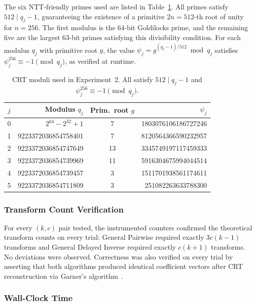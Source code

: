 \documentclass[runningheads]{llncs}
\begin{document}
The six NTT-friendly primes used are listed in Table~\ref{tab:exp2_moduli}. All primes satisfy $512 \mid q_j - 1$, guaranteeing the existence of a primitive $2n = 512$-th root of unity for $n = 256$. The first modulus is the 64-bit Goldilocks prime, and the remaining five are the largest 63-bit primes satisfying this divisibility condition. For each modulus $q_j$ with primitive root $g$, the value $\psi_j = g^{(q_j - 1)/512} \bmod q_j$ satisfies $\psi_j^{256} \equiv -1 \pmod{q_j}$, as verified at runtime.

\begin{table}[H]
\centering
\small
\begin{tabular}{c r c r}
\hline
$j$ & Modulus $q_j$ & Prim.\ root $g$ & $\psi_j$ \\
\hline
0 & $2^{64} - 2^{32} + 1$ & 7  & 1803076106186727246 \\
1 & 9223372036854758401   & 7  & 8120564366590232957 \\
2 & 9223372036854747649   & 13 & 3345749197117459333 \\
3 & 9223372036854739969   & 11 & 5916304675994044514 \\
4 & 9223372036854739457   & 3  & 1511701938561174611 \\
5 & 9223372036854711809   & 3  & 251082263633788300  \\
\hline
\end{tabular}
\caption{CRT moduli used in Experiment~2. All satisfy $512 \mid q_j - 1$ and $\psi_j^{256} \equiv -1 \pmod{q_j}$.}
\label{tab:exp2_moduli}
\end{table}

\FloatBarrier
\subsubsection*{Transform Count Verification}

For every $(k, c)$ pair tested, the instrumented counters confirmed the theoretical transform counts on every trial: General Pairwise required exactly $3c(k-1)$ transforms and General Delayed Inverse required exactly $c(k+1)$ transforms. No deviations were observed. Correctness was also verified on every trial by asserting that both algorithms produced identical coefficient vectors after CRT reconstruction via Garner's algorithm~\cite{garner1959residue}.

\subsubsection*{Wall-Clock Time}
\end{document}
